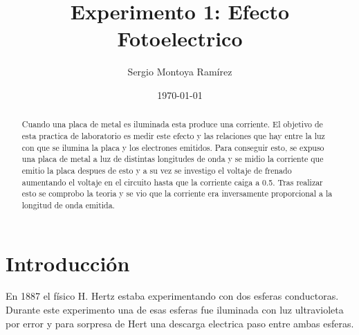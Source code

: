 \documentclass[a4paper, amsfonts, amssymb, amsmath, reprint, showkeys, nofootinbib, twoside]{revtex4-1}
\begin{document}
\title{Experimento 1: Efecto Fotoelectrico}


\author{Sergio Montoya Ramírez}

  


\date{\today} %

\begin{abstract}

   Cuando una placa de metal es iluminada esta produce una corriente. El objetivo de esta practica de laboratorio es medir este efecto y las relaciones que hay entre la luz con que se ilumina la placa y los electrones emitidos. Para conseguir esto, se expuso una placa de metal a luz de distintas longitudes de onda y se midio la corriente que emitio la placa despues de esto y a su vez se investigo el voltaje de frenado aumentando el voltaje en el circuito hasta que la corriente caiga a 0.5. Tras realizar esto se comprobo la teoria y se vio que la corriente era inversamente proporcional a la longitud de onda emitida.

\end{abstract}

\maketitle

\section{Introducción}
En 1887 el físico H. Hertz estaba experimentando con dos esferas conductoras. Durante este experimento una de esas esferas fue iluminada con luz ultravioleta por error y para sorpresa de Hert una descarga electrica paso entre ambas esferas.
\end{document}
